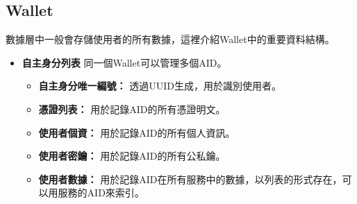 \subsection{Wallet}
數據層中一般會存儲使用者的所有數據，這裡介紹Wallet中的重要資料結構。
\begin{itemize}
  \item \textbf{自主身分列表} 同一個Wallet可以管理多個AID。
        \begin{itemize}
          \item \textbf{自主身分唯一編號：} 透過UUID生成，用於識別使用者。
          \item \textbf{憑證列表：} 用於記錄AID的所有憑證明文。
          \item \textbf{使用者個資：} 用於記錄AID的所有個人資訊。
          \item \textbf{使用者密鑰：} 用於記錄AID的所有公私鑰。
          \item \textbf{使用者數據：} 用於記錄AID在所有服務中的數據，以列表的形式存在，可以用服務的AID來索引。
        \end{itemize}
\end{itemize}

